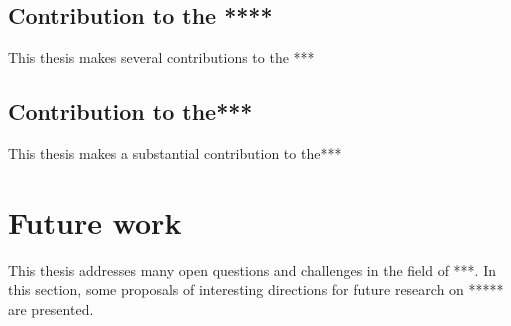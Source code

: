 \subsection{Contribution to the ****}

This thesis makes several contributions to the ***



\subsection{Contribution to the***}

This thesis makes a substantial contribution to the***


\section{Future work}

This thesis addresses many open questions and challenges in the field of ***. In this section, some proposals of interesting directions for future research on ***** are presented.


